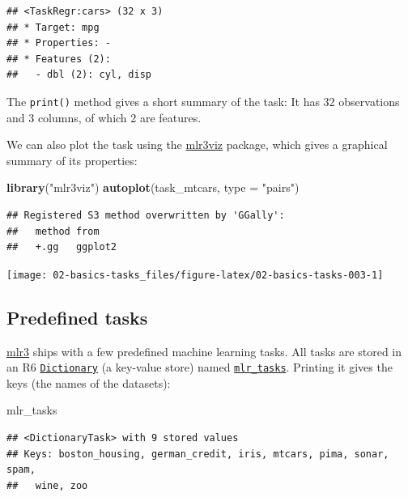 \documentclass[]{scrbook}
\newenvironment{Shaded}{\begin{snugshade}}{\end{snugshade}}
\newcommand{\DataTypeTok}[1]{\textcolor[rgb]{0.13,0.29,0.53}{#1}}
\newcommand{\KeywordTok}[1]{\textcolor[rgb]{0.13,0.29,0.53}{\textbf{#1}}}
\newcommand{\NormalTok}[1]{#1}
\newcommand{\StringTok}[1]{\textcolor[rgb]{0.31,0.60,0.02}{#1}}
\renewenvironment{Shaded} {\begin{snugshade}\small} {\end{snugshade}}
\begin{document}
\begin{verbatim}
## <TaskRegr:cars> (32 x 3)
## * Target: mpg
## * Properties: -
## * Features (2):
##   - dbl (2): cyl, disp
\end{verbatim}

The \texttt{print()} method gives a short summary of the task:
It has 32 observations and 3 columns, of which 2 are features.

We can also plot the task using the \href{https://mlr3viz.mlr-org.com}{mlr3viz} package, which gives a graphical summary of its properties:

\begin{Shaded}
\begin{Highlighting}[]
\KeywordTok{library}\NormalTok{(}\StringTok{"mlr3viz"}\NormalTok{)}
\KeywordTok{autoplot}\NormalTok{(task_mtcars, }\DataTypeTok{type =} \StringTok{"pairs"}\NormalTok{)}
\end{Highlighting}
\end{Shaded}

\begin{verbatim}
## Registered S3 method overwritten by 'GGally':
##   method from   
##   +.gg   ggplot2
\end{verbatim}

\begin{center}\texttt{[image: 02-basics-tasks\_files/figure-latex/02-basics-tasks-003-1]} \end{center}

\hypertarget{tasks-predefined}{%
\subsection{Predefined tasks}\label{tasks-predefined}}

\href{https://mlr3.mlr-org.com}{mlr3} ships with a few predefined machine learning tasks.
All tasks are stored in an R6 \href{https://mlr3misc.mlr-org.com/reference/Dictionary.html}{\texttt{Dictionary}} (a key-value store) named \href{https://mlr3.mlr-org.com/reference/mlr_tasks.html}{\texttt{mlr\_tasks}}.
Printing it gives the keys (the names of the datasets):

\begin{Shaded}
\begin{Highlighting}[]
\NormalTok{mlr_tasks}
\end{Highlighting}
\end{Shaded}

\begin{verbatim}
## <DictionaryTask> with 9 stored values
## Keys: boston_housing, german_credit, iris, mtcars, pima, sonar, spam,
##   wine, zoo
\end{verbatim}
\end{document}

